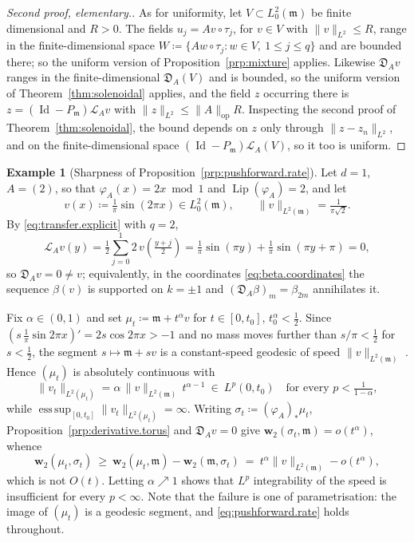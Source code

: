\documentclass[11pt,reqno]{amsart}
\theoremstyle{plain}
\theoremstyle{definition}
\newtheorem{exm}[thm]{Example}
\newcommand{\dw}{\mathbf{w}_2}
\newcommand{\Leb}{\mathfrak{m}}
\newcommand{\D}{\mathfrak{D}}
\newcommand{\Transf}{\mathcal{L}}
\DeclareMathOperator{\Id}{Id}
\DeclareMathOperator{\Lip}{Lip}
\DeclareMathOperator*{\esssup}{ess\,sup}
\begin{document}
\begin{proof}[Second proof, elementary.]
    As for uniformity, let \( V\subset L^2_0(\Leb) \) be finite dimensional and \( R>0 \).
    The fields \( u_j=Av\circ\tau_j \), for \( v\in V \) with \( \lVert v \rVert_{L^2}\le R \), range in the finite-dimensional space \( W\coloneqq \{Aw\circ\tau_j:w\in V,\ 1\le j\le q\} \) and are bounded there; so the uniform version of Proposition~\ref{prp:mixture} applies.
    Likewise \( \D_Av \) ranges in the finite-dimensional \( \D_A(V) \) and is bounded, so the uniform version of Theorem~\ref{thm:solenoidal} applies, and the field \( z \) occurring there is \( z=(\Id-P_\Leb)\Transf_A v \) with \( \lVert z \rVert_{L^2}\le\lVert A \rVert_{\mathrm{op}}R \).
    Inspecting the second proof of Theorem~\ref{thm:solenoidal}, the bound depends on \( z \) only through \( \lVert z-z_n \rVert_{L^2} \), and on the finite-dimensional space \( (\Id-P_\Leb)\Transf_A (V) \), so it too is uniform.
\end{proof}

\begin{exm}[Sharpness of Proposition~\ref{prp:pushforward.rate}]\label{exm:rate.sharpness}
    Let \( d=1 \), \( A=(2) \), so that \( \varphi_A(x)=2x \bmod 1 \) and \( \Lip(\varphi_A)=2 \), and let
    \[
        v(x)\coloneqq\tfrac1\pi\sin(2\pi x)\in L^2_0(\Leb),\qquad \lVert v\rVert_{L^2(\Leb)}=\tfrac{1}{\pi\sqrt2} .
    \]
    By \eqref{eq:transfer.explicit} with \( q=2 \),
    \[
        \Transf_A v(y)=\tfrac12\sum_{j=0}^{1}2\,v\!\left(\tfrac{y+j}{2}\right)
        =\tfrac1\pi\sin(\pi y)+\tfrac1\pi\sin(\pi y+\pi)=0 ,
    \]
    so \( \D_Av=0\neq v \); equivalently, in the coordinates \eqref{eq:beta.coordinates} the sequence \( \beta(v) \) is supported on \( k=\pm1 \) and \( (\D_A\beta)_m=\beta_{2m} \) annihilates it.

    Fix \( \alpha\in(0,1) \) and set \( \mu_t\coloneqq\Leb+t^{\alpha}v \) for \( t\in[0,t_0] \), \( t_0^\alpha<\tfrac12 \).
    Since \( \left(s\,\tfrac1\pi\sin2\pi x\right)'=2s\cos2\pi x>-1 \) and no mass moves further than \( s/\pi<\tfrac12 \) for \( s<\tfrac12 \), the segment \( s\mapsto\Leb+sv \) is a constant-speed geodesic of speed \( \lVert v\rVert_{L^2(\Leb)} \) \cite[\S3.3]{kloeckner_optimal_2013}.
    Hence \( (\mu_t) \) is absolutely continuous with
    \[
        \big\lVert v_t\big\rVert_{L^2(\mu_t)}=\alpha\,\lVert v\rVert_{L^2(\Leb)}\,t^{\alpha-1}
        \ \in\ L^p(0,t_0)\quad\text{for every }p<\tfrac{1}{1-\alpha},
    \]
    while \( \esssup_{[0,t_0]}\lVert v_t\rVert_{L^2(\mu_t)}=\infty \).
    Writing \( \sigma_t\coloneqq(\varphi_A)_\ast\mu_t \), Proposition~\ref{prp:derivative.torus} and \( \D_Av=0 \) give \( \dw(\sigma_t,\Leb)=o(t^{\alpha}) \), whence
    \[
        \dw(\mu_t,\sigma_t)\ \ge\ \dw(\mu_t,\Leb)-\dw(\Leb,\sigma_t)
        \ =\ t^{\alpha}\lVert v\rVert_{L^2(\Leb)}-o(t^{\alpha}) ,
    \]
    which is not \( O(t) \).
    Letting \( \alpha\nearrow1 \) shows that \( L^p \) integrability of the speed is insufficient for every \( p<\infty \).
    Note that the failure is one of parametrisation: the image of \( (\mu_t) \) is a geodesic segment, and \eqref{eq:pushforward.rate} holds throughout.
\end{exm}
\end{document}
